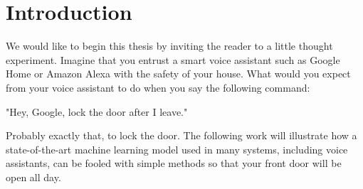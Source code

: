 
\section{Introduction}
We would like to begin this thesis by inviting the reader to a little thought experiment. Imagine that you entrust a smart voice assistant such as Google Home or Amazon Alexa with the safety of your house. What would you expect from your voice assistant to do when you say the following command:

"Hey, Google, lock the door after I leave."

Probably exactly that, to lock the door. The following work will illustrate how a state-of-the-art machine learning model used in many systems, including voice assistants, can be fooled with simple methods so that your front door will be open all day. 

